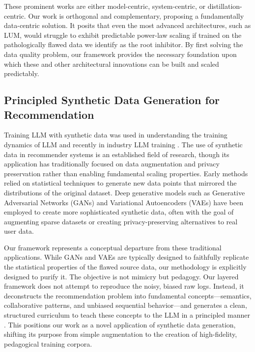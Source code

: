 \documentclass[]{fairmeta}
\begin{document}
These prominent works are either model-centric, system-centric, or distillation-centric. Our work is orthogonal and complementary, proposing a fundamentally data-centric solution. It posits that even the most advanced architectures, such as LUM, would struggle to exhibit predictable power-law scaling if trained on the pathologically flawed data we identify as the root inhibitor. By first solving the data quality problem, our framework provides the necessary foundation upon which these and other architectural innovations can be built and scaled predictably.

\subsection{Principled Synthetic Data Generation for Recommendation}
Training LLM with synthetic data was used in understanding the training dynamics of LLM \cite{yang2024syntheticcontinuedpretraining,allenzhu2024physicslanguagemodels31,hronTrainingLanguageModels2024, wang2025datavalueagescaling, kang2025demystifyingsyntheticdatallm} and recently in industry LLM training \cite{yangQwen3TechnicalReport2025}. The use of synthetic data in recommender systems is an established field of research, though its application has traditionally focused on data augmentation \cite{qi2020searchbasedusermodelinglifelong} and privacy preservation \cite{adouani:hal-05113907} rather than enabling fundamental scaling properties. Early methods relied on statistical techniques to generate new data points that mirrored the distributions of the original dataset. Deep generative models such as Generative Adversarial Networks (GANs) \cite{bharadhwajRecGANRecurrentGenerative2018} and Variational Autoencoders (VAEs) \cite{adouani:hal-05113907} have been employed to create more sophisticated synthetic data, often with the goal of augmenting sparse datasets or creating privacy-preserving alternatives to real user data. 

Our framework represents a conceptual departure from these traditional applications. While GANs and VAEs are typically designed to faithfully replicate the statistical properties of the flawed source data, our methodology is explicitly designed to purify it. The objective is not mimicry but pedagogy. Our layered framework does not attempt to reproduce the noisy, biased raw logs. Instead, it deconstructs the recommendation problem into fundamental concepts—semantics, collaborative patterns, and unbiased sequential behavior—and generates a clean, structured curriculum to teach these concepts to the LLM in a principled manner \cite{chen2025selfevolvingcurriculumllmreasoning, soviany2022curriculumlearningsurvey}. This positions our work as a novel application of synthetic data generation, shifting its purpose from simple augmentation to the creation of high-fidelity, pedagogical training corpora.
\end{document}

